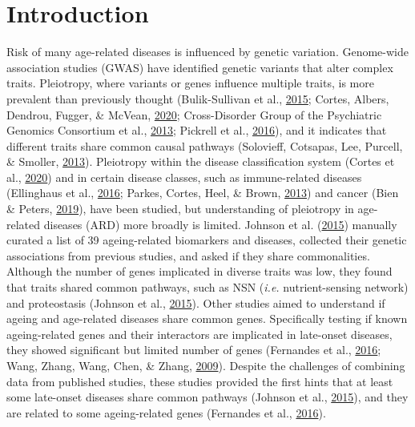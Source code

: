 \documentclass[12pt,twoside]{unicam}
\begin{document}
\normalsize

\hypertarget{introduction-2}{%
\section{Introduction}\label{introduction-2}}

Risk of many age-related diseases is influenced by genetic variation. Genome-wide association studies (GWAS) have identified genetic variants that alter complex traits. Pleiotropy, where variants or genes influence multiple traits, is more prevalent than previously thought (Bulik-Sullivan et al., \protect\hyperlink{ref-Bulik-Sullivan2015}{2015}; Cortes, Albers, Dendrou, Fugger, \& McVean, \protect\hyperlink{ref-Cortes2020}{2020}; Cross-Disorder Group of the Psychiatric Genomics Consortium et al., \protect\hyperlink{ref-Cross-Disorder_Group_of_the_Psychiatric_Genomics_Consortium2013}{2013}; Pickrell et al., \protect\hyperlink{ref-Pickrell2016}{2016}), and it indicates that different traits share common causal pathways (Solovieff, Cotsapas, Lee, Purcell, \& Smoller, \protect\hyperlink{ref-Solovieff2013}{2013}). Pleiotropy within the disease classification system (Cortes et al., \protect\hyperlink{ref-Cortes2020}{2020}) and in certain disease classes, such as immune-related diseases (Ellinghaus et al., \protect\hyperlink{ref-Ellinghaus2016}{2016}; Parkes, Cortes, Heel, \& Brown, \protect\hyperlink{ref-Parkes2013}{2013}) and cancer (Bien \& Peters, \protect\hyperlink{ref-Bien2019}{2019}), have been studied, but understanding of pleiotropy in age-related diseases (ARD) more broadly is limited. Johnson et al. (\protect\hyperlink{ref-Johnson2015}{2015}) manually curated a list of 39 ageing-related biomarkers and diseases, collected their genetic associations from previous studies, and asked if they share commonalities. Although the number of genes implicated in diverse traits was low, they found that traits shared common pathways, such as NSN (\emph{i.e.} nutrient-sensing network) and proteostasis (Johnson et al., \protect\hyperlink{ref-Johnson2015}{2015}). Other studies aimed to understand if ageing and age-related diseases share common genes. Specifically testing if known ageing-related genes and their interactors are implicated in late-onset diseases, they showed significant but limited number of genes (Fernandes et al., \protect\hyperlink{ref-Fernandes2016}{2016}; Wang, Zhang, Wang, Chen, \& Zhang, \protect\hyperlink{ref-Wang2009}{2009}). Despite the challenges of combining data from published studies, these studies provided the first hints that at least some late-onset diseases share common pathways (Johnson et al., \protect\hyperlink{ref-Johnson2015}{2015}), and they are related to some ageing-related genes (Fernandes et al., \protect\hyperlink{ref-Fernandes2016}{2016}).
\end{document}
